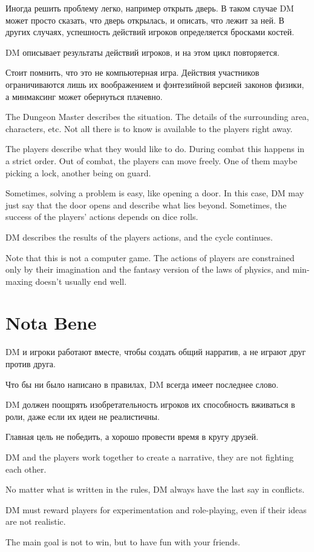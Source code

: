 \documentclass[a5paper,11pt]{book}
\begin{document}
\begin{multicols}{2}
\begin{ru}
Иногда решить проблему легко, например открыть дверь. В таком случае DM может просто сказать, что дверь открылась, и описать, что лежит за ней. В других случаях, успешность действий игроков определяется бросками костей.

DM описывает результаты действий игроков, и на этом цикл повторяется.

Стоит помнить, что это не компьютерная игра. Действия участников ограничиваются лишь их воображением и фэнтезийной версией законов физики, а минмаксинг может обернуться плачевно.
\end{ru}

\begin{en}
The Dungeon Master describes the situation. The details of the surrounding area, characters, etc. Not all there is to know is available to the players right away.

The players describe what they would like to do. During combat this happens in a strict order. Out of combat, the players can move freely. One of them maybe picking a lock, another being on guard.

Sometimes, solving a problem is easy, like opening a door. In this case, DM may just say that the door opens and describe what lies beyond. Sometimes, the success of the players' actions depends on dice rolls.

DM describes the results of the players actions, and the cycle continues.

Note that this is not a computer game. The actions of players are constrained only by their imagination and the fantasy version of the laws of physics, and min-maxing doesn't usually end well.
\end{en}

\section{Nota Bene}
\begin{ru}
DM и игроки работают вместе, чтобы создать общий нарратив, а не играют друг против друга.

Что бы ни было написано в правилах, DM всегда имеет последнее слово.

DM должен поощрять изобретательность игроков их способность вживаться в роли, даже если их идеи не реалистичны.

Главная цель не победить, а хорошо провести время в кругу друзей.
\end{ru}

\begin{en}
DM and the players work together to create a narrative, they are not fighting each other.

No matter what is written in the rules, DM always have the last say in conflicts.

DM must reward players for experimentation and role-playing, even if their ideas are not realistic.

The main goal is not to win, but to have fun with your friends.
\end{en}

\end{multicols}
\end{document}
